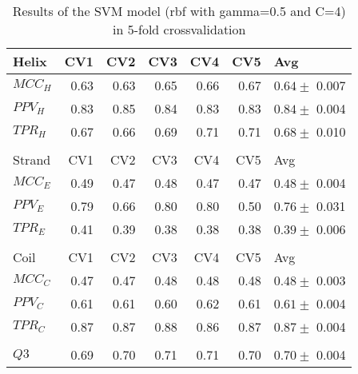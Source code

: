 \documentclass[11pt]{article}
\begin{document}
\begin{table}[htbp]
\caption{Results of the SVM model (rbf with gamma=0.5 and C=4) in 5-fold crossvalidation}
\centering
\begin{tabular}{lrrrrrl}
Helix & CV1 & CV2 & CV3 & CV4 & CV5 & Avg\\
\hline
\(MCC_H\) & 0.63 & 0.63 & 0.65 & 0.66 & 0.67 & \(0.64 \pm\) 0.007\\
\(PPV_H\) & 0.83 & 0.85 & 0.84 & 0.83 & 0.83 & \(0.84 \pm\) 0.004\\
\(TPR_H\) & 0.67 & 0.66 & 0.69 & 0.71 & 0.71 & \(0.68 \pm\) 0.010\\
 &  &  &  &  &  & \\
Strand & CV1 & CV2 & CV3 & CV4 & CV5 & Avg\\
\hline
\(MCC_E\) & 0.49 & 0.47 & 0.48 & 0.47 & 0.47 & \(0.48 \pm\)  0.004\\
\(PPV_E\) & 0.79 & 0.66 & 0.80 & 0.80 & 0.50 & \(0.76 \pm\) 0.031\\
\(TPR_E\) & 0.41 & 0.39 & 0.38 & 0.38 & 0.38 & \(0.39 \pm\) 0.006\\
 &  &  &  &  &  & \\
Coil & CV1 & CV2 & CV3 & CV4 & CV5 & Avg\\
\hline
\(MCC_C\) & 0.47 & 0.47 & 0.48 & 0.48 & 0.48 & \(0.48 \pm\) 0.003\\
\(PPV_C\) & 0.61 & 0.61 & 0.60 & 0.62 & 0.61 & \(0.61 \pm\) 0.004\\
\(TPR_C\) & 0.87 & 0.87 & 0.88 & 0.86 & 0.87 & \(0.87 \pm\)  0.004\\
 &  &  &  &  &  & \\
\hline
\(Q3\) & 0.69 & 0.70 & 0.71 & 0.71 & 0.70 & \(0.70 \pm\)  0.004\\
\end{tabular}
\end{table}
\end{document}

